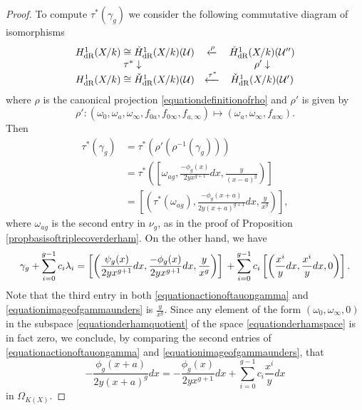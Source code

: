 \begin{proof}
    To compute $\tau^*(\gamma_g)$ we consider the following commutative diagram of isomorphisms
        \[
        \begin{array}{ccc}
        H_{\text {dR}}^1(X/k) \cong \check{H}_{\text {dR}}^1(X/k)({\mathcal U})  & \xleftarrow{\rho} & \check{H}_{\text {dR}}^1(X/k)({\mathcal U}'')  \\
                \hspace{-0.5em}\tau^*\downarrow & ~ & \rho'\downarrow  \\
        H_{\text {dR}}^1(X/k) \cong \check{H}_{\text {dR}}^1(X/k)({\mathcal U})  & \xleftarrow{\tau^*} & \check{H}_{\text {dR}}^1(X/k)({\mathcal U}')
        \end{array}
        \]
        where $\rho$ is the canonical projection \eqref{equationdefinitionofrho} and $\rho'$ is given by
            \[
            \rho' \colon (\omega_0, \omega_a, \omega_\infty, f_{0 a}, f_{0 \infty}, f_{a, \infty}) \mapsto (\omega_a, \omega_\infty, f_{a \infty}).
            \]
    Then 
        \begin{equation}\label{equationactionoftauongamma}
        \begin{split}
        \tau^*(\gamma_g) & = \tau^*(\rho'(\rho^{-1}(\gamma_g))) \\  
        & = \tau^*\left( \left[ \omega_{a g}, \frac{- \phi_g(x)}{2yx^{g+1}} dx, \frac{y}{(x-a)^g} \right) \right] \\
        & = \left[ \left( \tau^*(\omega_{a g}) , \frac{-\phi_g(x+a)}{2y(x+a)^{g+1}}dx, \frac{y}{x^g} \right) \right],
        \end{split}
        \end{equation}
    where $\omega_{a g}$ is the second entry in $\nu_g$, as in the proof of Proposition \ref{propbasisoftriplecoverderham}.
    On the other hand, we have 
        \begin{equation}\label{equationimageofgammaunders}
        \gamma_g + \sum_{i=0}^{g-1} c_i \lambda_i = \left[ \left( \frac{\psi_g(x)}{2yx^{g+1}}dx, \frac{-\phi_g(x)}{2yx^{g+1}}dx, \frac{y}{x^g} \right) \right] \\ + \sum_{i=0}^{g-1} c_i \left[ \left( \frac{x^i}{y}dx, \frac{x^i}{y}dx, 0 \right) \right].
        \end{equation}
    Note that the third entry in both \eqref{equationactionoftauongamma} and \eqref{equationimageofgammaunders} is $\frac{y}{x^g}$.
    Since any element of the form $(\omega_0, \omega_\infty, 0)$ in the subspace \eqref{equationderhamquotient} of the space \eqref{equationderhamspace} is in fact zero, we conclude, by comparing the second entries of \eqref{equationactionoftauongamma} and \eqref{equationimageofgammaunders}, that
        \[
        - \frac{\phi_g(x+a)}{2y(x+a)^g} dx = -\frac{\phi_g(x)}{2yx^{g+1}}dx + \sum_{i = 0}^{g-1} c_i \frac{x^i}{y}dx
        \]
    in $\Omega_{K(X)}$.
    

\end{proof}
